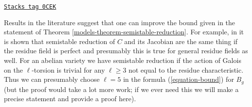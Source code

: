 \begin{remark}

\label{models-remark-improving-bound}
\href{https://stacks.math.columbia.edu/tag/0CEK}{\texttt{Stacks tag 0CEK}}

Results in the literature suggest that one can improve the bound
given in the statement of Theorem \ref{models-theorem-semistable-reduction}.
For example, in \cite{DM} it is shown that semistable reduction
of $C$ and its Jacobian are the same thing if the residue field is perfect
and presumably this is true for general residue fields as well.
For an abelian variety we have semistable reduction if the action of Galois
on the $\ell$-torsion is trivial for any $\ell \geq 3$ not equal to the
residue characteristic. Thus we can presumably choose $\ell = 5$
in the formula (\ref{equation-bound}) for $B_g$
(but the proof would take a lot more work; if we ever need this
we will make a precise statement and provide a proof here).
\end{remark}



